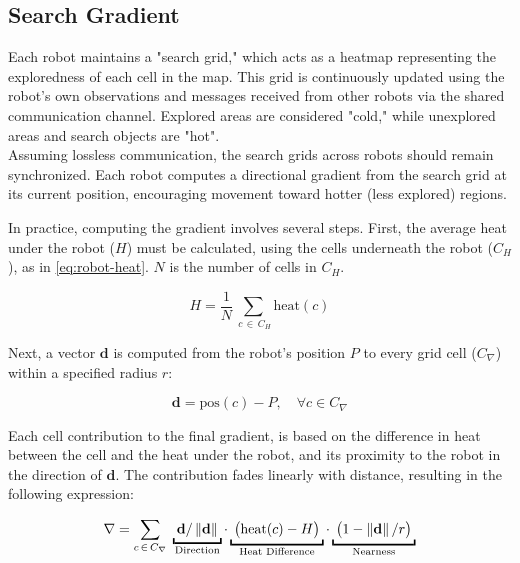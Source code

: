 \subsection{Search Gradient}
\label{sec:search-gradient}

Each robot maintains a "search grid," which acts as a heatmap representing the exploredness of each cell in the map. This grid is continuously updated using the robot’s own observations and messages received from other robots via the shared communication channel. Explored areas are considered "cold," while unexplored areas and search objects are "hot".  \\

Assuming lossless communication, the search grids across robots should remain synchronized. Each robot computes a directional gradient from the search grid at its current position, encouraging movement toward hotter (less explored) regions. 

In practice, computing the gradient involves several steps. First, the average heat under the robot ($H$) must be calculated, using the cells underneath the robot ($C_H$), as in \cref{eq:robot-heat}. $N$ is the number of cells in $C_H$.

\begin{equation}
\label{eq:robot-heat}
    H = \frac{1}{N} \sum_{\;c\,\in\,C_H} \mathrm{heat}(c)
\end{equation}

Next, a vector $\mathbf{d}$ is computed from the robot's position $P$ to every grid cell ($C_\nabla$) within a specified radius $r$:

\begin{equation}
    \mathbf{d} = \mathrm{pos}(c) - P, \quad \forall c \in C_\nabla
\end{equation}

Each cell contribution to the final gradient, is based on the difference in heat between the cell and the heat under the robot, and its proximity to the robot in the direction of $\mathbf{d}$. The contribution fades linearly with distance, resulting in the following expression:

\begin{equation}
    \nabla = \sum_{c\,\in\,C_\nabla} \;
    \underbracket{\; \mathbf{d}/\norm{\mathbf{d}}      \;}_\text{\makebox[0pt]{Direction}} \cdot
    \underbracket{\; \big(\mathrm{heat}(c) - H\big)    \;}_\text{Heat Difference} \cdot
    \underbracket{\; \big(1 - \norm{\mathbf{d}}/r\big) \;}_\text{Nearness}
    \label{eq:fade-gradient}
\end{equation}

